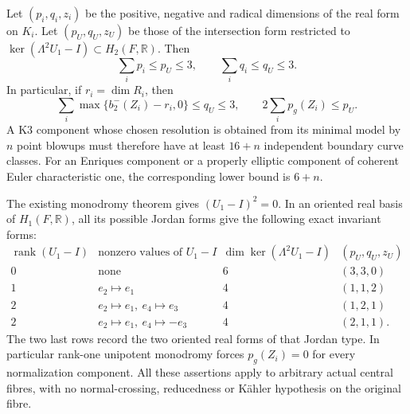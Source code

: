 \begin{proposition}
Let $(p_i,q_i,z_i)$ be the positive, negative and
radical dimensions of the real form on $K_i$.
Let $(p_U,q_U,z_U)$ be those of the intersection
form restricted to
$\ker(\Lambda^2U_1-I)\subset H_2(F,\mathbb R)$.
Then
\[
             \sum_i p_i\le p_U\le3,\qquad
             \sum_i q_i\le q_U\le3.                 \tag{C.CL.4}\label{cdp:eq:C.CL.4}
\]
In particular, if $r_i=\dim R_i$, then
\[
 \sum_i\max\{b_2^-(Z_i)-r_i,0\}\le q_U\le3,
 \qquad
                 2\sum_i p_g(Z_i)\le p_U.           \tag{C.CL.5}\label{cdp:eq:C.CL.5}
\]
A K3 component whose chosen resolution is obtained
from its minimal model by $n$ point blowups must
therefore have at least $16+n$ independent boundary
curve classes. For an Enriques component or a
properly elliptic component of coherent Euler
characteristic one, the corresponding lower bound
is $6+n$.

The existing monodromy theorem gives
$(U_1-I)^2=0$. In an oriented real basis of
$H_1(F,\mathbb R)$, all its possible Jordan forms
give the following exact invariant forms:
\[
\begin{array}{c|c|c|c}
\operatorname{rank}(U_1-I)&\text{nonzero values of }U_1-I
 &\dim\ker(\Lambda^2U_1-I)&(p_U,q_U,z_U)\\ \hline
0&\text{none}&6&(3,3,0)\\
1&e_2\mapsto e_1&4&(1,1,2)\\
2&e_2\mapsto e_1,\ e_4\mapsto e_3&4&(1,2,1)\\
2&e_2\mapsto e_1,\ e_4\mapsto-e_3&4&(2,1,1).
\end{array}                                                   \tag{C.CL.6}\label{cdp:eq:C.CL.6}
\]
The two last rows record the two oriented real
forms of that Jordan type. In particular rank-one
unipotent monodromy forces $p_g(Z_i)=0$ for every
normalization component. All these assertions
apply to arbitrary actual central fibres, with
no normal-crossing, reducedness or K\"ahler
hypothesis on the original fibre.
\end{proposition}

